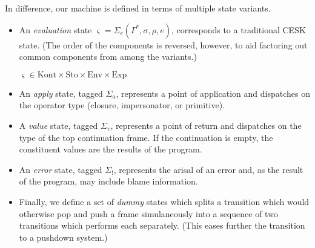 \documentclass{sigplanconf}
\begin{document}
In difference, our machine is defined in terms of multiple state variants.
\begin{itemize}
\item An \emph{evaluation} state $\varsigma=\Sigma_{e}(\Gamma^{*},\sigma,\rho,e)$, corresponds to a traditional CESK state.
(The order of the components is reversed, however, to aid factoring out common components from among the variants.)

$\varsigma\in\mathrm{Kont}\times\mathrm{Sto}\times\mathrm{Env}\times\mathrm{Exp}$

\item An \emph{apply} state, tagged $\Sigma_{a}$, represents a point of application and dispatches on the operator type (closure, impersonator, or primitive).
\item A \emph{value} state, tagged $\Sigma_{v}$, represents a point of return and dispatches on the type of the top continuation frame.
If the continuation is empty, the constituent values are the results of the program.
\item An \emph{error} state, tagged $\Sigma_!$, represents the arisal of an error and, as the result of the program, may include blame information.
\item Finally, we define a set of \emph{dummy} states which splits a transition which would otherwise pop and push a frame simulaneously into a sequence of two transitions which performs each separately.
(This eases further the transition to a pushdown system.)
\end{itemize}


\end{document}
